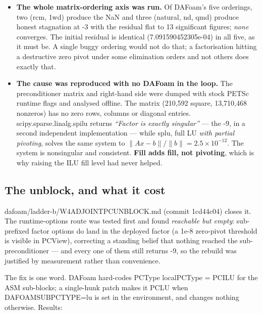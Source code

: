 \documentclass[11pt,a4paper]{article}
\newcommand{\breakus}{\textunderscore\allowbreak}
\newcommand{\code}[1]{{\small\ttfamily\let\_\breakus #1}}
\newcommand{\artifact}[1]{{\footnotesize\ttfamily\let\_\breakus #1}}
\begin{document}
\begin{itemize}
\item \textbf{The whole matrix-ordering axis was run.} Of DAFoam's five orderings, two
  (\code{rcm}, \code{1wd}) produce the NaN and three (\code{natural}, \code{nd},
  \code{qmd}) produce honest stagnation at \code{-3} with the residual flat to 13
  significant figures; \emph{none} converges. The initial residual is identical
  (7.091590452305e-04) in all five, as it must be. A single buggy ordering would not do
  that; a factorisation hitting a destructive zero pivot under some elimination orders and
  not others does exactly that.
\item \textbf{The cause was reproduced with no DAFoam in the loop.} The preconditioner
  matrix and right-hand side were dumped with stock PETSc runtime flags and analysed
  offline. The matrix (210{,}592 square, 13{,}710{,}468 nonzeros) has no zero rows, columns
  or diagonal entries. \code{scipy.sparse.linalg.spilu} returns \emph{``Factor is exactly
  singular''} --- the \code{-9}, in a second independent implementation --- while
  \code{splu}, full LU \emph{with partial pivoting}, solves the same system to
  $\lVert Ax-b\rVert/\lVert b\rVert = 2.5\times10^{-12}$. The system is nonsingular and
  consistent. \textbf{Fill adds fill, not pivoting}, which is why raising the ILU fill level
  had never helped.
\end{itemize}

\subsection{The unblock, and what it cost}
\label{sec:fdverif}

\artifact{dafoam/ladder-b/W4\_ADJOINT\_PC\_UNBLOCK.md} (commit
\code{1cd44c04}) closes it. The runtime-options route was tested first and found
\emph{reachable but empty}: \code{sub\_}-prefixed factor options do land in the deployed
factor (a 1e-8 zero-pivot threshold is visible in \code{PCView}), correcting a standing
belief that nothing reached the sub-preconditioner --- and every one of them still returns
\code{-9}, so the rebuild was justified by measurement rather than convenience.

The fix is one word. DAFoam hard-codes \code{PCType localPCType = PCILU} for the ASM
sub-blocks; a single-hunk patch makes it \code{PCLU} when
\code{DAFOAM\_SUBPC\_TYPE=lu} is set in the environment, and changes nothing otherwise.
Results:
\end{document}
